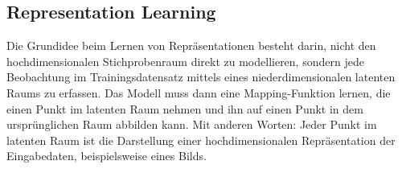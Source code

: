 \subsection{Representation Learning}\label{Representation Learning}
Die Grundidee beim Lernen von Repräsentationen besteht darin, nicht den hochdimensionalen Stichprobenraum direkt zu modellieren, sondern jede Beobachtung im Trainingsdatensatz mittels eines niederdimensionalen latenten Raums zu erfassen. Das Modell muss dann eine Mapping-Funktion lernen, die einen Punkt im latenten Raum nehmen und ihn auf einen Punkt in dem ursprünglichen Raum abbilden kann. Mit anderen Worten: Jeder Punkt im latenten Raum ist die Darstellung einer hochdimensionalen Repräsentation der Eingabedaten, beispielsweise eines Bilds.



